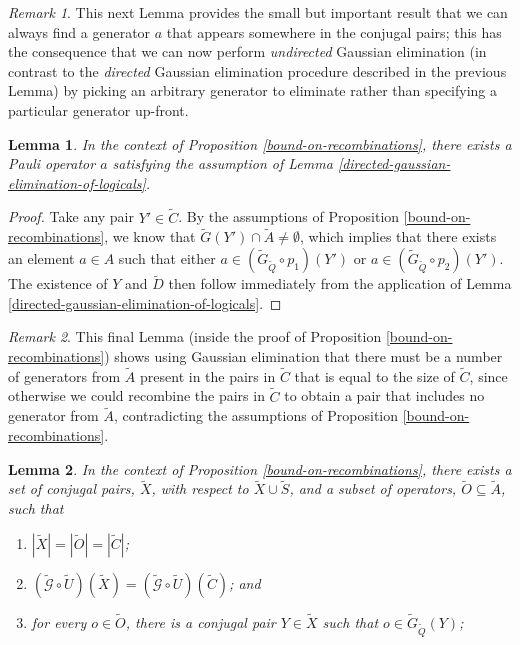 \documentclass{amsbook}
\theoremstyle{plain}
\newtheorem{lemma}{Lemma}
\theoremstyle{definition}
\theoremstyle{remark}
\newtheorem{remark}{Remark}
\newcommand{\set}{\tilde}
\newcommand{\genfun}{\tilde{\mathcal{G}}}
\begin{document}
\begin{remark}
This next Lemma provides the small but important result that we can always find a generator $a$ that appears somewhere in the conjugal pairs;  this has the consequence that we can now perform \emph{undirected} Gaussian elimination (in contrast to the \emph{directed} Gaussian elimination procedure described in the previous Lemma) by picking an arbitrary generator to eliminate rather than specifying a particular generator up-front.
\end{remark}

\begin{lemma}
\label{undirected-gaussian-elimination-of-logicals}
In the context of Proposition \ref{bound-on-recombinations}, there exists a Pauli operator $a$ satisfying the assumption of Lemma \ref{directed-gaussian-elimination-of-logicals}.
\end{lemma}

\begin{proof}
Take any pair $Y'\in\set C$.  By the assumptions of Proposition \ref{bound-on-recombinations}, we know that $\set G(Y')\cap \set A \ne \emptyset$, which implies that there exists an element $a\in A$ such that either $a\in (\set G_{\set Q}\circ p_1)(Y')$ or $a\in (\set G_{\set Q}\circ p_2)(Y')$.  The existence of $Y$ and $\set D$ then follow immediately from the application of Lemma \ref{directed-gaussian-elimination-of-logicals}.
\end{proof}
\begin{remark}
This final Lemma (inside the proof of Proposition \ref{bound-on-recombinations}) shows using Gaussian elimination that there must be a number of generators from $\set A$ present in the pairs in $\set C$ that is equal to the size of $\set C$, since otherwise we could recombine the pairs in $\set C$ to obtain a pair that includes no generator from $\set A$, contradicting the assumptions of Proposition \ref{bound-on-recombinations}.
\end{remark}
\begin{lemma}
\label{elimination-to-create-subset}
In the context of Proposition \ref{bound-on-recombinations}, there exists a set of conjugal pairs, $\set X$, with respect to $\set X\cup\set S$, and a subset of operators, $\set O\subseteq \set A$, such that
\begin{enumerate}
\item $|\set X|=|\set O|=|\set C|$;
\item $(\genfun\circ\set U)(\set X)=(\genfun\circ\set U)(\set C)$; and
\item for every $o\in\set O$, there is a conjugal pair $Y\in\set X$ such that $o\in\set G_{\set Q}(Y)$;
\end{enumerate}
\end{lemma}
\end{document}
